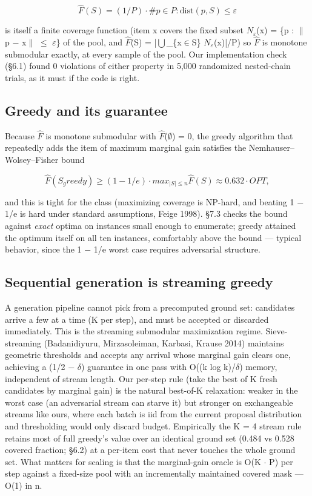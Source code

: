 \documentclass[11pt]{article}
\theoremstyle{plain}
\theoremstyle{definition}
\begin{document}
\[
\hat{F}(S) = (1/P) \cdot  \#{ p \in  P : \mathrm{dist}(p, S) \leq  \varepsilon  }
\]

is itself a finite coverage function (item x covers the fixed subset $N_\varepsilon $(x) = \{p : $\|$p $-$ x$\|$ $\leq$ $\varepsilon$\} of the pool, and $\hat{F}$(S) = |$\bigcup$\_\{x$\in$S\} $N_\varepsilon $(x)|/P) so $\hat{F}$ is monotone submodular exactly, at every sample of the pool. Our implementation check (\S{}6.1) found 0 violations of either property in 5,000 randomized nested-chain trials, as it must if the code is right.

\subsection{Greedy and its guarantee}
Because $\hat{F}$ is monotone submodular with $\hat{F}$($\emptyset$) = 0, the greedy algorithm that repeatedly adds the item of maximum marginal gain satisfies the Nemhauser--Wolsey--Fisher bound

\[
\hat{F}(S_greedy) \geq  (1 - 1/e) \cdot  max_{|S|\leq n} \hat{F}(S) \approx  0.632 \cdot  OPT,
\]

and this is tight for the class (maximizing coverage is NP-hard, and beating 1 $-$ 1/e is hard under standard assumptions, Feige 1998). \S{}7.3 checks the bound against \emph{exact} optima on instances small enough to enumerate; greedy attained the optimum itself on all ten instances, comfortably above the bound --- typical behavior, since the 1 $-$ 1/e worst case requires adversarial structure.

\subsection{Sequential generation is streaming greedy}
A generation pipeline cannot pick from a precomputed ground set: candidates arrive a few at a time (K per step), and must be accepted or discarded immediately. This is the streaming submodular maximization regime. Sieve-streaming (Badanidiyuru, Mirzasoleiman, Karbasi, Krause 2014) maintains geometric thresholds and accepts any arrival whose marginal gain clears one, achieving a (1/2 $-$ $\delta$) guarantee in one pass with O((k log k)/$\delta$) memory, independent of stream length. Our per-step rule (take the best of K fresh candidates by marginal gain) is the natural best-of-K relaxation: weaker in the worst case (an adversarial stream can starve it) but stronger on exchangeable streams like ours, where each batch is iid from the current proposal distribution and thresholding would only discard budget. Empirically the K = 4 stream rule retains most of full greedy's value over an identical ground set (0.484 vs 0.528 covered fraction; \S{}6.2) at a per-item cost that never touches the whole ground set. What matters for scaling is that the marginal-gain oracle is O(K $\cdot$ P) per step against a fixed-size pool with an incrementally maintained covered mask --- O(1) in n.
\end{document}
